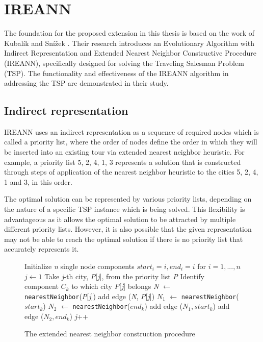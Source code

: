 \documentclass[twoside]{ctuthesis}
\theoremstyle{plain}
\theoremstyle{definition}
\theoremstyle{note}
\begin{document}
\section{IREANN}
The foundation for the proposed extension in this thesis is based on the work of Kubalík and Snížek \cite{kubalik2014novel}. Their research introduces an Evolutionary Algorithm with Indirect Representation and Extended Nearest Neighbor Constructive Procedure (IREANN), specifically designed for solving the Traveling Salesman Problem (TSP). The functionality and effectiveness of the IREANN algorithm in addressing the TSP are demonstrated in their study.

\subsection{Indirect representation}
IREANN uses an indirect representation as a sequence of required nodes which is called a priority list, where the order of nodes define the order in which they will be inserted into an existing tour via extended nearest neighbor heuristic. For example, a priority list {5, 2, 4, 1, 3} represents a solution that is constructed through steps of application of the nearest neighbor heuristic to the cities 5, 2, 4, 1 and 3, in this order.

The optimal solution can be represented by various priority lists, depending on the nature of a specific TSP instance which is being solved. This flexibility is advantageous as it allows the optimal solution to be attracted by multiple different priority lists. However, it is also possible that the given representation may not be able to reach the optimal solution if there is no priority list that accurately represents it.


\begin{figure}
\begin{algorithmic}[1]
\State Initialize \emph{n} single node components \emph{$ start_i = i, end_i = i $} for \emph{$ i = 1, ..., n $}
\State $j \gets 1$
\Do
\State Take \emph{j}-th city, \emph{P}[\emph{j}], from the priority list \emph{P}
\State Identify component \emph{$ C_k $} to which city \emph{P}[\emph{j}] belongs
\State \emph{N} $\gets$ {\tt nearestNeighbor}(\emph{P}[\emph{j}])
\State add edge (\emph{N}, \emph{P}[\emph{j}])
\Else
\State \emph{$ N_1 $} $\gets$ {\tt nearestNeighbor}(\emph{$ start_k $})
\State \emph{$ N_2 $} $\gets$ {\tt nearestNeighbor}(\emph{$ end_k $})
\State add edge (\emph{$ N_1, start_k $})
\Else
\State add edge (\emph{$ N_2, end_k $})
\EndIf
\EndIf
\State \emph{j}++

\end{algorithmic}
	\caption{The extended nearest neighbor construction procedure}
	\label{fig:cnnptsp}
\end{figure}
\end{document}
